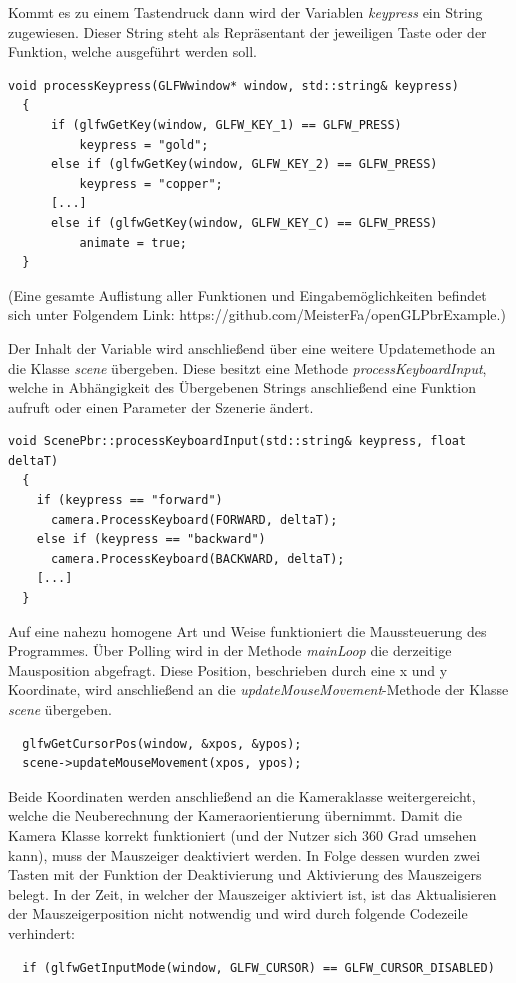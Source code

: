 \documentclass[
  11pt,
  a4paper,
  oneside
  ]{article}
\begin{document}
Kommt es zu einem Tastendruck dann wird der Variablen \textit{keypress} ein String zugewiesen. Dieser String steht als Repräsentant der jeweiligen Taste oder der Funktion, welche ausgeführt werden soll. 
\begin{lstlisting}[tabsize=2]
  void processKeypress(GLFWwindow* window, std::string& keypress)
  {
      if (glfwGetKey(window, GLFW_KEY_1) == GLFW_PRESS)
          keypress = "gold";
      else if (glfwGetKey(window, GLFW_KEY_2) == GLFW_PRESS)
          keypress = "copper";
      [...]
      else if (glfwGetKey(window, GLFW_KEY_C) == GLFW_PRESS)
          animate = true;
  }
\end{lstlisting}
(Eine gesamte Auflistung aller Funktionen und Eingabemöglichkeiten befindet sich unter Folgendem Link: https://github.com/MeisterFa/openGLPbrExample.) 

Der Inhalt der Variable wird anschließend über eine weitere Updatemethode an die Klasse \textit{scene} übergeben. Diese besitzt eine Methode \textit{processKeyboardInput}, welche in Abhängigkeit des Übergebenen Strings anschließend eine Funktion aufruft oder einen Parameter der Szenerie ändert. 
\begin{lstlisting}[tabsize=2]
  void ScenePbr::processKeyboardInput(std::string& keypress, float deltaT)
  {
    if (keypress == "forward")
      camera.ProcessKeyboard(FORWARD, deltaT);
    else if (keypress == "backward")
      camera.ProcessKeyboard(BACKWARD, deltaT);
    [...]
  }
\end{lstlisting}

Auf eine nahezu homogene Art und Weise funktioniert die Maussteuerung des Programmes. Über Polling wird in der Methode \textit{mainLoop} die derzeitige Mausposition abgefragt. Diese Position, beschrieben durch eine x und y Koordinate, wird anschließend an die \textit{updateMouseMovement}-Methode der Klasse \textit{scene} übergeben. 
\begin{lstlisting}
  glfwGetCursorPos(window, &xpos, &ypos);
  scene->updateMouseMovement(xpos, ypos);
\end{lstlisting}

Beide Koordinaten werden anschließend an die Kameraklasse weitergereicht, welche die Neuberechnung der Kameraorientierung übernimmt. Damit die Kamera Klasse korrekt funktioniert (und der Nutzer sich 360 Grad umsehen kann), muss der Mauszeiger deaktiviert werden. In Folge dessen wurden zwei Tasten mit der Funktion der Deaktivierung und Aktivierung des Mauszeigers belegt. In der Zeit, in welcher der Mauszeiger aktiviert ist, ist das Aktualisieren der Mauszeigerposition nicht notwendig und wird durch folgende Codezeile verhindert: 
\begin{lstlisting}
  if (glfwGetInputMode(window, GLFW_CURSOR) == GLFW_CURSOR_DISABLED)
\end{lstlisting}
\end{document}
